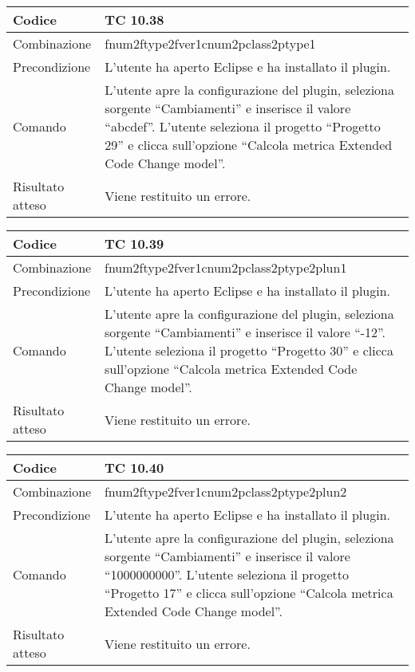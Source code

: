 \begin{table}[ht]
\begin{tabular}{|p{3cm}|p{9cm}|}
\hline
\cellcolor{lightgray}Codice				& TC 10.38								\\
\hline
\cellcolor{lightgray}Combinazione		& fnum2ftype2fver1cnum2pclass2ptype1									\\
\hline
\cellcolor{lightgray}Precondizione		& L'utente ha aperto Eclipse e ha installato il plugin.		\\
\hline
\cellcolor{lightgray}Comando			& L'utente apre la configurazione del plugin, seleziona sorgente ``Cambiamenti'' e inserisce il valore ``abcdef''. L'utente seleziona il progetto ``Progetto 29''  e clicca sull'opzione ``Calcola metrica Extended Code Change model''.	\\
\hline
\cellcolor{lightgray}Risultato atteso	& Viene restituito un errore.\\
\hline
\end{tabular}
\end{table}

\begin{table}[ht]
\begin{tabular}{|p{3cm}|p{9cm}|}
\hline
\cellcolor{lightgray}Codice				& TC 10.39								\\
\hline
\cellcolor{lightgray}Combinazione		& fnum2ftype2fver1cnum2pclass2ptype2plun1									\\
\hline
\cellcolor{lightgray}Precondizione		& L'utente ha aperto Eclipse e ha installato il plugin.		\\
\hline
\cellcolor{lightgray}Comando			& L'utente apre la configurazione del plugin, seleziona sorgente ``Cambiamenti'' e inserisce il valore ``-12''. L'utente seleziona il progetto ``Progetto 30''  e clicca sull'opzione ``Calcola metrica Extended Code Change model''.	\\
\hline
\cellcolor{lightgray}Risultato atteso	& Viene restituito un errore.\\
\hline
\end{tabular}
\end{table}

\begin{table}[ht]
\begin{tabular}{|p{3cm}|p{9cm}|}
\hline
\cellcolor{lightgray}Codice				& TC 10.40								\\
\hline
\cellcolor{lightgray}Combinazione		& fnum2ftype2fver1cnum2pclass2ptype2plun2									\\
\hline
\cellcolor{lightgray}Precondizione		& L'utente ha aperto Eclipse e ha installato il plugin.		\\
\hline
\cellcolor{lightgray}Comando			& L'utente apre la configurazione del plugin, seleziona sorgente ``Cambiamenti'' e inserisce il valore ``1000000000''. L'utente seleziona il progetto ``Progetto 17''  e clicca sull'opzione ``Calcola metrica Extended Code Change model''.	\\
\hline
\cellcolor{lightgray}Risultato atteso	& Viene restituito un errore.\\
\hline
\end{tabular}
\end{table}


